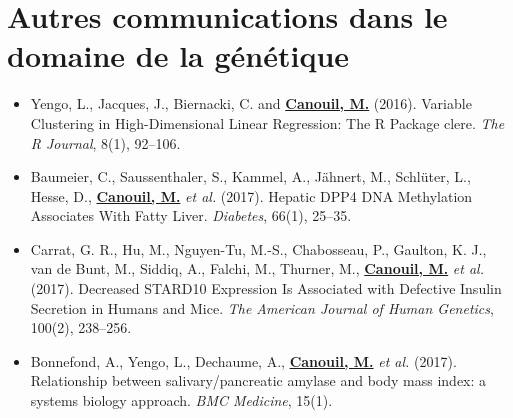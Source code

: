 \documentclass[11pt,a4paper,notrimn]{krantz}
\theoremstyle{definition}
\theoremstyle{definition}
\theoremstyle{remark}
\begin{document}
\section{Autres communications dans le domaine de la
génétique}\label{autres-communications-dans-le-domaine-de-la-genetique}

\begin{itemize}
\item Yengo, L., Jacques, J., Biernacki, C. and \underline{\textbf{Canouil, M.}} (2016). Variable Clustering in High-Dimensional Linear Regression: The R Package clere. \textit{The R Journal}, 8(1), 92–106.

\item Baumeier, C., Saussenthaler, S., Kammel, A., Jähnert, M., Schlüter, L., Hesse, D., \underline{\textbf{Canouil, M.}} \textit{et al.} (2017). Hepatic DPP4 DNA Methylation Associates With Fatty Liver. \textit{Diabetes}, 66(1), 25–35.

\item Carrat, G. R., Hu, M., Nguyen-Tu, M.-S., Chabosseau, P., Gaulton, K. J., van de Bunt, M., Siddiq, A., Falchi, M., Thurner, M., \underline{\textbf{Canouil, M.}} \textit{et al.} (2017). Decreased STARD10 Expression Is Associated with Defective Insulin Secretion in Humans and Mice. \textit{The American Journal of Human Genetics}, 100(2), 238–256.

\item Bonnefond, A., Yengo, L., Dechaume, A., \underline{\textbf{Canouil, M.}} \textit{et al.} (2017). Relationship between salivary/pancreatic amylase and body mass index: a systems biology approach. \textit{BMC Medicine}, 15(1).
\end{itemize}

\clearpage



\backmatter
\printindex
\end{document}

